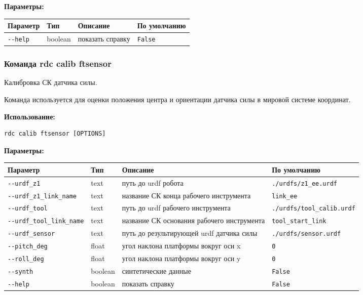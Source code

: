 \textbf{Параметры:}
\begin{center}
\fontsize{10pt}{10pt}\selectfont
\begin{longtable}[]{p{5cm}|p{2cm}|p{3.5cm}|p{5cm}}
    \hline
\toprule()
Параметр & Тип & Описание & По умолчанию \\
\hline
\midrule()
\endhead
\texttt{-\/-help} & boolean & показать справку &
\texttt{False} \\
\bottomrule()
\hline
\end{longtable}
\end{center}

\hypertarget{rdc-calib-ftsensor}{%
\subsubsection{ Команда rdc calib ftsensor}\label{rdc-calib-ftsensor}}

Калибровка СК датчика силы.

Команда используется для оценки положения центра и ориентации датчика силы в мировой системе координат.

\textbf{Использование:}
\begin{lstlisting}[language=python, numbers=none, frame=single]
rdc calib ftsensor [OPTIONS]
\end{lstlisting}

\textbf{Параметры:}
\begin{center}
\fontsize{10pt}{10pt}\selectfont
\begin{longtable}[]{p{5.2cm}|p{2cm}|p{3.5cm}|p{5cm}}
    \hline
\toprule()
Параметр & Тип & Описание & По умолчанию \\
\hline
\midrule()
\endhead
\texttt{-\/-urdf\_z1} & text & путь до urdf робота &
\texttt{./urdfs/z1\_ee.urdf} \\
\hline
\texttt{-\/-urdf\_z1\_link\_name} & text & название СК конца рабочего инструмента &
\texttt{link\_ee} \\
\hline
\texttt{-\/-urdf\_tool} & text & путь до urdf рабочего инструмента &
\texttt{./urdfs/tool\_calib.urdf} \\
\hline
\texttt{-\/-urdf\_tool\_link\_name} & text & название СК основания рабочего инструмента & \texttt{tool\_start\_link} \\
\hline
\texttt{-\/-urdf\_sensor} & text & путь до результирующей urdf датчика силы &
\texttt{./urdfs/sensor.urdf} \\
\hline
\texttt{-\/-pitch\_deg} & float & угол наклона платформы вокруг оси x &
\texttt{0} \\
\hline
\texttt{-\/-roll\_deg} & float & угол наклона платформы вокруг оси y &
\texttt{0} \\
\hline
\texttt{-\/-synth} & boolean & синтетические данные & \texttt{False} \\
\hline
\texttt{-\/-help} & boolean & показать справку &
\texttt{False} \\
\hline
\bottomrule()
\hline
\end{longtable}
\end{center}

